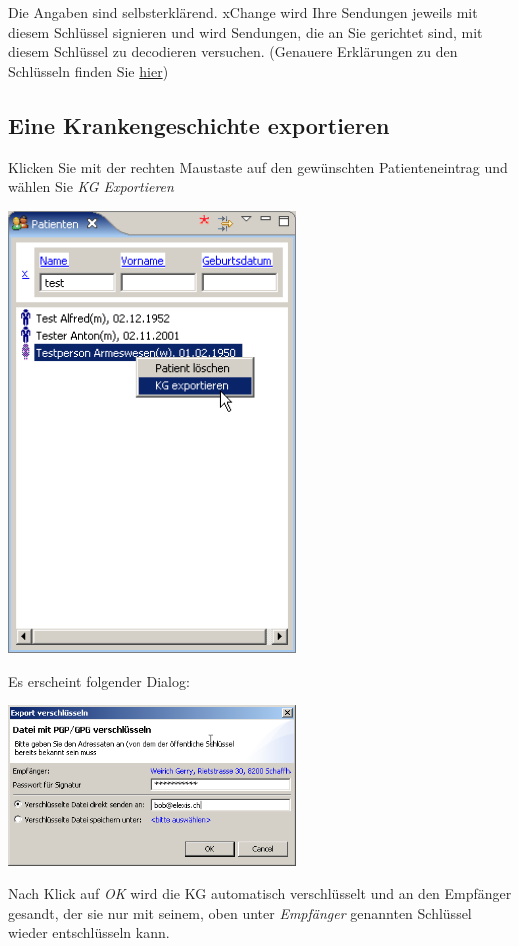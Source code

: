 Die Angaben sind selbsterklärend. xChange wird Ihre Sendungen jeweils mit diesem Schlüssel signieren und wird Sendungen, die an Sie gerichtet sind, mit diesem Schlüssel zu decodieren versuchen.
(Genauere Erklärungen zu den Schlüsseln finden Sie \href{http://www.elexis.ch/jp/index.php?option=content&task=view&id=64}{hier})
\subsection{Eine Krankengeschichte exportieren}
Klicken Sie mit der rechten Maustaste auf den gewünschten Patienteneintrag und wählen Sie \textit{KG Exportieren}

\includegraphics[width=3in]{images/xc3.png}

 Es erscheint folgender Dialog:

\includegraphics[width=3in]{images/xc4.png}

Nach Klick auf \textit{OK} wird die KG automatisch verschlüsselt und an den Empfänger gesandt, der sie nur mit seinem, oben unter \textit{Empfänger} genannten Schlüssel wieder entschlüsseln kann.

